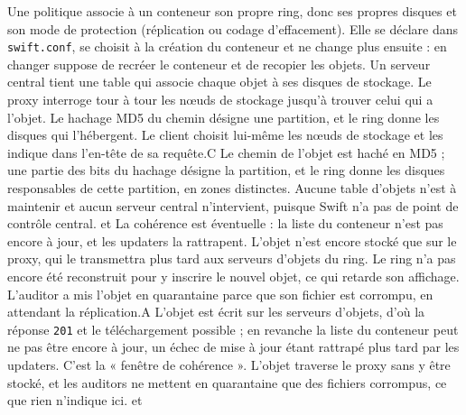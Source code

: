   {Une politique associe à un conteneur son propre ring, donc ses propres disques et son mode de protection (réplication ou codage d'effacement). Elle se déclare dans \texttt{swift.conf}, se choisit à la création du conteneur et ne change plus ensuite : en changer suppose de recréer le conteneur et de recopier les objets.}
  {}
  {Un serveur central tient une table qui associe chaque objet à ses disques de stockage.}
  {Le proxy interroge tour à tour les nœuds de stockage jusqu'à trouver celui qui a l'objet.}
  {Le hachage MD5 du chemin désigne une partition, et le ring donne les disques qui l'hébergent.}
  {Le client choisit lui-même les nœuds de stockage et les indique dans l'en-tête de sa requête.}{C}
  {Le chemin de l'objet est haché en MD5 ; une partie des bits du hachage désigne la partition, et le ring donne les disques responsables de cette partition, en zones distinctes. Aucune table d'objets n'est à maintenir et aucun serveur central n'intervient, puisque Swift n'a pas de point de contrôle central.}
  { et }
  {La cohérence est éventuelle : la liste du conteneur n'est pas encore à jour, et les updaters la rattrapent.}
  {L'objet n'est encore stocké que sur le proxy, qui le transmettra plus tard aux serveurs d'objets du ring.}
  {Le ring n'a pas encore été reconstruit pour y inscrire le nouvel objet, ce qui retarde son affichage.}
  {L'auditor a mis l'objet en quarantaine parce que son fichier est corrompu, en attendant la réplication.}{A}
  {L'objet est écrit sur les serveurs d'objets, d'où la réponse \texttt{201} et le téléchargement possible ; en revanche la liste du conteneur peut ne pas être encore à jour, un échec de mise à jour étant rattrapé plus tard par les updaters. C'est la « fenêtre de cohérence ». L'objet traverse le proxy sans y être stocké, et les auditors ne mettent en quarantaine que des fichiers corrompus, ce que rien n'indique ici.}
  { et }

